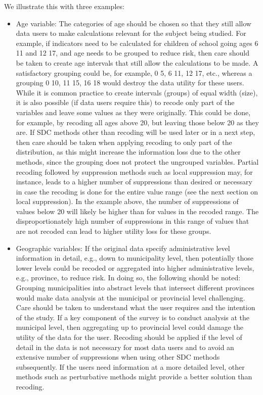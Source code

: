\documentclass[letterpaper,10pt,english]{sphinxmanual}
\begin{document}
We illustrate this with three examples:
\begin{itemize}
\item {} 
Age variable: The categories of age should be chosen so that they
still allow data users to make calculations relevant for the subject
being studied. For example, if indicators need to be calculated for
children of school going ages 6 \textendash{} 11 and 12 \textendash{} 17, and age needs to be
grouped to reduce risk, then care should be taken to create age
intervals that still allow the calculations to be made. A
satisfactory grouping could be, for example, 0 \textendash{} 5, 6 \textendash{} 11, 12 \textendash{} 17,
etc., whereas a grouping 0 \textendash{} 10, 11 \textendash{} 15, 16 \textendash{} 18 would destroy the
data utility for these users. While it is common practice to create
intervals (groups) of equal width (size), it is also possible (if
data users require this) to recode only part of the variables and
leave some values as they were originally. This could be done, for
example, by recoding all ages above 20, but leaving those below 20 as
they are. If SDC methods other than recoding will be used later or in
a next step, then care should be taken when applying recoding to only
part of the distribution, as this might increase the information loss
due to the other methods, since the grouping does not protect the
ungrouped variables. Partial recoding followed by suppression methods
such as local suppression may, for instance, leads to a higher number
of suppressions than desired or necessary in case the recoding is
done for the entire value range (see the next section on local
suppression). In the example above, the number of suppressions of
values below 20 will likely be higher than for values in the recoded
range. The disproportionately high number of suppressions in this
range of values that are not recoded can lead to higher utility loss
for these groups.

\item {} 
Geographic variables: If the original data specify administrative
level information in detail, e.g., down to municipality level, then
potentially those lower levels could be recoded or aggregated into
higher administrative levels, e.g., province, to reduce risk. In
doing so, the following should be noted: Grouping municipalities into
abstract levels that intersect different provinces would make data
analysis at the municipal or provincial level challenging. Care
should be taken to understand what the user requires and the
intention of the study. If a key component of the survey is to
conduct analysis at the municipal level, then aggregating up to
provincial level could damage the utility of the data for the user.
Recoding should be applied if the level of detail in the data is not
necessary for most data users and to avoid an extensive number of
suppressions when using other SDC methods subsequently. If the users
need information at a more detailed level, other methods such as
perturbative methods might provide a better solution than recoding.


\end{itemize}
\end{document}
